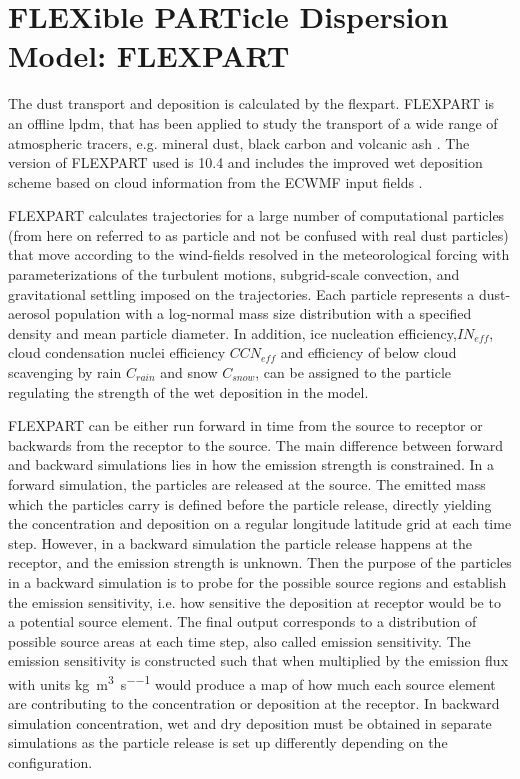 \section{FLEXible PARTicle Dispersion Model: FLEXPART}
\par The dust transport and deposition is calculated by the \acrfull{flexpart}. FLEXPART is an offline \acrshort{lpdm}, that has been applied to study the transport of a wide range of atmospheric tracers, e.g. mineral dust, black carbon and volcanic ash \parencite{flexdust_ref_2016,choi_investigation_2020, eckhardt2008estimation}. 
The version of FLEXPART used is 10.4 and includes the improved wet deposition scheme based on cloud information from the ECWMF input fields \parencite{flexpart_wetdep}. 
\par FLEXPART calculates trajectories for a large number of computational particles (from here on referred to as particle and not be confused with real dust particles) that move according to the wind-fields resolved in the meteorological forcing with parameterizations of the turbulent motions, subgrid-scale convection, and gravitational settling imposed on the trajectories. Each particle represents a dust-aerosol population with a log-normal mass size distribution with a specified density and mean particle diameter. In addition, ice nucleation efficiency,$IN_{eff}$, cloud condensation nuclei efficiency $CCN_{eff}$ and efficiency of below cloud scavenging by rain $C_{rain}$ and snow $C_{snow}$, can be assigned to the particle regulating the strength of the wet deposition in the model.   

FLEXPART can be either run forward in time from the source to receptor or backwards from the receptor to the source. The main difference between forward and backward simulations lies in how the emission strength is constrained. 
In a forward simulation, the particles are released at the source. The emitted mass which the particles carry is defined before the particle release, directly yielding the concentration and deposition on a regular longitude latitude grid at each time step.
However, in a backward simulation the particle release happens at the receptor, and the emission strength is unknown. Then the purpose of the particles in a backward simulation is to probe for the possible source regions and establish the emission sensitivity, i.e. how sensitive the deposition at receptor would be to a potential source element. 
The final output corresponds to a distribution of possible source areas at each time step, also called emission sensitivity. The emission sensitivity is constructed such that when multiplied by the emission flux with units \si{\kg\per\cubic\metre\per\s} would produce a map of how much each source element are contributing to the concentration or deposition at the receptor. In backward simulation concentration, wet and dry deposition must be obtained in separate simulations as the particle release is set up differently depending on the configuration.  
